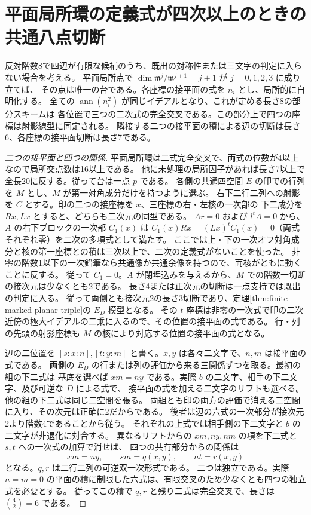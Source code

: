 \section{平面局所環の定義式が四次以上のときの共通八点切断}
\label{sec:finite-high-order-common-octad}
\begin{theorem}\label{thm:finite-high-order-common-octad}
反対階数8で四辺が有限な候補のうち、既出の対称性または三文字の判定に入らない場合を考える。
平面局所点で $\dim\mathfrak m^j/\mathfrak m^{j+1}=j+1$ が $j=0,1,2,3$ に成り立てば、
その点は唯一の台である。各座標の接平面の式を $n_i$ とし、局所的に自明化する。
全ての $\operatorname{ann}(n_i^2)$ が同じイデアルとなり、これが定める長さ8の部分スキームは
各位置で三つの二次式の完全交叉である。この部分上で四つの座標は射影線型に同定される。
隣接する二つの接平面の積による辺の切断は長さ6、各座標の接平面切断は長さ7である。
\end{theorem}
\begin{proof}[二つの接平面と四つの関係]
平面局所環は二式完全交叉で、両式の位数が4以上なので局所交点数は16以上である。
他に未処理の局所因子があれば長さ7以上で全長20に反する。従って台は一点 $p$ である。
各側の共通四空間 $E$ の印での行列を $M$ とし、$M$ が第一対角成分だけを持つように選ぶ。
右下二行二列への射影を $C$ とする。印の二つの接座標を $x$、三座標の右・左核の一次部の
下二成分を $Rx,Lx$ とすると、どちらも二次元の同型である。
$A r=0$ および $l^t A=0$ から、$A$ の右下ブロックの一次部 $C_1(x)$ は
$C_1(x)Rx=(Lx)^tC_1(x)=0$（両式それぞれ零）を二次の多項式として満たす。
ここでは上・下の一次オフ対角成分と核の第一座標との積は三次以上で、二次の定義式がないことを使った。
非零の階数1以下の一次鉛筆なら共通像か共通余像を持つので、両核がともに動くことに反する。
従って $C_1=0$。$A$ が閉埋込みを与えるから、$M$ での階数一切断の接次元は少なくとも2である。
長さ4または正次元の切断は一点支持では既出の判定に入る。
従って両側とも接次元2の長さ3切断であり、定理\ref{thm:finite-marked-planar-triple}の $E_D$ 模型となる。
その $t$ 座標は非零の一次式で印の二次近傍の極大イデアルの二乗に入るので、その位置の接平面の式である。
行・列の先頭の射影座標も $M$ の核により対応する位置の接平面の式となる。

辺の二位置を $[s:x:n],[t:y:m]$ と書く。$x,y$ は各々二文字で、$n,m$ は接平面の式である。
両側の $E_D$ の行または列の評価から来る三関係ずつを取る。最初の組の下二式は
基底を選べば $xm=ny$ である。実際 $b$ の二文字、相手の下二文字、及び可逆な $D$ による式で、
接平面の式を加える二文字のリフトも選べる。他の組の下二式は同じ二空間を張る。
両組とも印の両方の評価で消える二空間に入り、その次元は正確に2だからである。
後者は辺の六式の一次部分が接次元2より階数4であることから従う。
それぞれの上式では相手側の下二文字と $b$ の二文字が非退化に対合する。
異なるリフトからの $xm,ny,nm$ の項を下二式と $s,t$ への一次式の加算で消せば、
四つの共有部分からの関係は
\[
                 xm=ny,\qquad sm=q(x,y),\qquad nt=r(x,y)
\]
となる。$q,r$ は二行二列の可逆双一次形式である。
二つは独立である。実際 $n=m=0$ の平面の積に制限した六式は、有限交叉のため少なくとも四つの独立式を必要とする。
従ってこの積で $q,r$ と残り二式は完全交叉で、長さは $\binom42=6$ である。

\end{proof}

